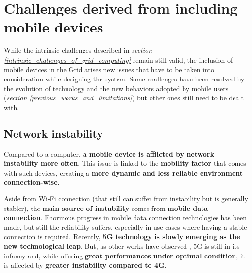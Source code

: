 \section{Challenges derived from including mobile devices}\label{challenges_derived_from_mobile_devides}
While the intrinsic challenges described in \textit{section \ref{intrinsic_challenges_of_grid_computing}} remain still valid, the inclusion of mobile devices in the Grid arises new issues that have to be taken into consideration while designing the system. Some challenges have been resolved by the evolution of technology and the new behaviors adopted by mobile users (\textit{section \ref{previous_works_and_limitations}}) but other ones still need to be dealt with.

\subsection{Network instability}
Compared to a computer, \textbf{a mobile device is afflicted by network instability more often}. This issue is linked to the \textbf{mobility factor} \cite{integrating_mobile_devices_into_grid} that comes with such devices, creating a \textbf{more dynamic and less reliable environment connection-wise}.

Aside from Wi-Fi connection (that still can suffer from instability but is generally stabler), the \textbf{main source of instability} comes from \textbf{mobile data connection}.
Enormous progress in mobile data connection technologies has been made, but still the reliability suffers, especially in use cases where having a stable connection is required. Recently, \textbf{5G technology is slowly emerging as the new technological leap}. But, as other works have observed \cite{5g_performances}, 5G is still in its infancy and, while offering \textbf{great performances under optimal condition}, it is affected by \textbf{greater instability compared to 4G}.

